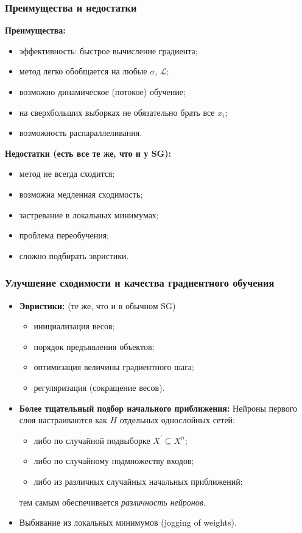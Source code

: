 \documentclass[unicode, notheorems]{beamer}
\begin{document}
\begin{frame}
	\frametitle{Преимущества и недостатки}
	\textbf{Преимущества:}
	\begin{itemize}
		\item эффективность: быстрое вычисление градиента;
		\item метод легко обобщается на любые $\sigma$, $\mathscr{L}$;
		\item возможно динамическое (потокое) обучение;
		\item на сверхбольших выборках не обязательно брать все $x_i$;
		\item возможность распараллеливания.
	\end{itemize}
	\vspace{0.7cm} 
	\textbf{Недостатки (есть все те же, что и у SG):}
	\begin{itemize}
		\item метод не всегда сходится;
		\item возможна медленная сходимость;
		\item застревание в локальных минимумах;
		\item проблема переобучения;
		\item сложно подбирать эвристики.
	\end{itemize}
\end{frame} 



  


\begin{frame}
	\frametitle{Улучшение сходимости и качества градиентного обучения}
		\begin{itemize}
	\item\textbf{Эвристики:} (те же, что и в обычном SG)
	\begin{itemize}
		\item инициализация весов;
		\item порядок предъявления объектов;
		\item оптимизация величины градиентного шага;
		\item регуляризация (сокращение весов). 
	\end{itemize} 
	\item\textbf{Более тщательный подбор начального приближения:}
	 Нейроны первого слоя настраиваются как $H$ отдельных однослойных сетей:
	\begin{itemize}
		\item либо по случайной подвыборке $X^{'} \subseteq X^n$;
		\item либо по случайному подмножеству входов;
		\item либо из различных случайных начальных приближений;
	\end{itemize}
	тем самым обеспечивается \textit{различность нейронов}.\\
\item Выбивание из локальных минимумов (jogging of weights).
 
	\end{itemize}
\end{frame} 
\end{document}

